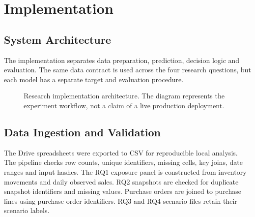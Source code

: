 \chapter{Implementation}
\label{chapter_implementation}

\section{System Architecture}
The implementation separates data preparation, prediction, decision logic and evaluation. The same data contract is used across the four research questions, but each model has a separate target and evaluation procedure.

\begin{figure}[htbp]
\centering
{}
\caption{Research implementation architecture. The diagram represents the experiment workflow, not a claim of a live production deployment.}
\label{fig:system_architecture}
\end{figure}

\section{Data Ingestion and Validation}
The Drive spreadsheets were exported to CSV for reproducible local analysis. The pipeline checks row counts, unique identifiers, missing cells, key joins, date ranges and input hashes. The RQ1 exposure panel is constructed from inventory movements and daily observed sales. RQ2 snapshots are checked for duplicate snapshot identifiers and missing values. Purchase orders are joined to purchase lines using purchase-order identifiers. RQ3 and RQ4 scenario files retain their scenario labels.

